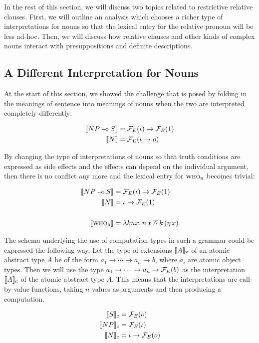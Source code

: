 In the rest of this section, we will discuss two topics related to
restrictive relative clauses. First, we will outline an analysis which
chooses a richer type of interpretations for nouns so that the lexical
entry for the relative pronoun will be less ad-hoc. Then, we will discuss how
relative clauses and other kinds of complex nouns interact with
presuppositions and definite descriptions.


\subsection{A Different Interpretation for Nouns}
\label{ssec:different-nouns}

At the start of this section, we showed the challenge that is posed by
folding in the meanings of sentence into meanings of nouns when the two are
interpreted completely differently:

\begin{align*}
  \llbracket NP \mathbin{{-}\mkern-3.5mu{\circ}} S \rrbracket &= \mathcal{F}_E(\iota) \to \mathcal{F}_E(1) \\
  \llbracket N \rrbracket &= \mathcal{F}_E(\iota \to o)
\end{align*}

By changing the type of interpretations of nouns so that truth conditions
are expressed as side effects and the effects can depend on the individual
argument, then there is no conflict any more and the lexical entry for
$\textsc{who}_{\textsc{r}}$ becomes trivial:

\begin{align*}
  \llbracket NP \mathbin{{-}\mkern-3.5mu{\circ}} S \rrbracket &= \mathcal{F}_E(\iota) \to \mathcal{F}_E(1) \\
  \llbracket N \rrbracket &= \iota \to \mathcal{F}_E(1) \\
  \\
  \llbracket \textsc{who}_{\textsc{r}} \rrbracket &= \lambda k n x.\, n\,x \mathbin{\overline{\land}} k\,(\eta\,x)
\end{align*}

The schema underlying the use of computation types in such a grammar could
be expressed the following way. Let the type of extensions
$\llbracket A \rrbracket_{\mathrm{v}}$ of an atomic abstract type $A$ be of the form
$a_1 \to \cdots \to a_n \to b$, where $a_i$ are atomic object types. Then
we will use the type $a_1 \to \cdots \to a_n \to \mathcal{F}_E(b)$ as the
interpretation $\llbracket A \rrbracket_{\mathrm{c}}$ of the atomic abstract type $A$. This
means that the interpretations are call-by-value functions, taking $n$
values as arguments and then producing a computation.

\begin{align*}
  \llbracket S \rrbracket_{\mathrm{c}} &= \mathcal{F}_E(o) \\
  \llbracket NP \rrbracket_{\mathrm{c}} &= \mathcal{F}_E(\iota) \\
  \llbracket N \rrbracket_{\mathrm{c}} &= \iota \to \mathcal{F}_E(o)
\end{align*}

